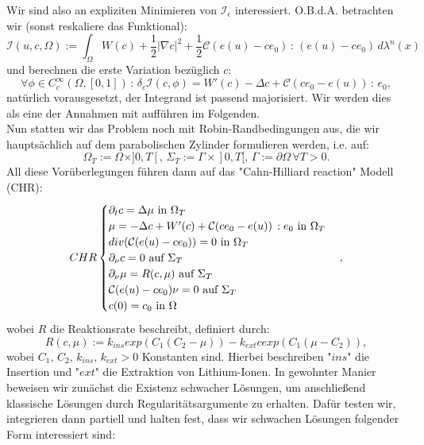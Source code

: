 Wir sind also an expliziten Minimieren von \(\mathcal{I}_{\epsilon}\) interessiert. O.B.d.A. betrachten wir (sonst reskaliere das Funktional):
\begin{equation}
    \mathcal{I}(u,c,\Omega) := \int_{\Omega} W(c) + \frac{1}{2} |\nabla c|^2 + \frac{1}{2} \mathcal{C}(e(u) - ce_0) \, : \, (e(u) - ce_0) \,d\lambda^n(x)
\end{equation}
und berechnen die erste Variation bezüglich \(c\):
\begin{equation}
    \forall \phi \in C^{\infty}_c(\Omega,[0,1]) \, : \, \delta_c \mathcal{I}(c,\phi) = W'(c) - \Delta c + \mathcal{C}(ce_0 - e(u)) \, : \, e_0,
\end{equation}
natürlich vorausgesetzt, der Integrand ist passend majorisiert. Wir werden dies als eine der Annahmen mit aufführen im Folgenden.\\
Nun statten wir das Problem noch mit Robin-Randbedingungen aus, die wir hauptsächlich auf dem parabolischen Zylinder formulieren werden, i.e. auf:
\begin{equation}
    \Omega_T := \Omega \times ]0,T[, \, \Sigma_T := \Gamma \times ]0,T[, \, \Gamma := \partial \Omega \, \forall T > 0.
\end{equation}
All diese Vorüberlegungen führen dann auf das "Cahn-Hilliard reaction" Modell (CHR):
\begin{equation}{\label{eq5.22}}
    CHR \begin{cases}
        \partial_t c = \Delta \mu \text{ in }\Omega_T\\
        \mu = -\Delta c + W'(c) + \mathcal{C}(ce_0 - e(u)) \, : e_0 \text{ in }\Omega_T\\
        div(\mathcal{C}(e(u) - ce_0)) = 0 \text{ in }\Omega_T\\
        \partial_{\nu}c = 0 \text{ auf }\Sigma_T\\
        \partial_{\nu} \mu = R(c,\mu) \text{ auf }\Sigma_T\\
        \mathcal{C}(e(u) - ce_0)\nu = 0 \text{ auf }\Sigma_T\\
        c(0) = c_0 \text{ in }\Omega
    \end{cases},
\end{equation}
wobei \(R\) die Reaktionsrate beschreibt, definiert durch:
\begin{equation}
    R(c,\mu) := k_{ins}exp(C_1(C_2 - \mu)) - k_{ext}c exp(C_1(\mu - C_2)),
\end{equation}
wobei \(C_1, \, C_2, \, k_{ins}, \, k_{ext} > 0\) Konstanten sind. Hierbei beschreiben "\(ins\)" die Insertion und "\(ext\)" die Extraktion von Lithium-Ionen. In gewohnter Manier beweisen wir zunächst die Existenz schwacher Lösungen, um anschließend klassische Lösungen durch Regularitätsargumente zu erhalten. Dafür testen wir, integrieren dann partiell und halten fest, dass wir schwachen Lösungen folgender Form interessiert sind:\\[0.5cm]
